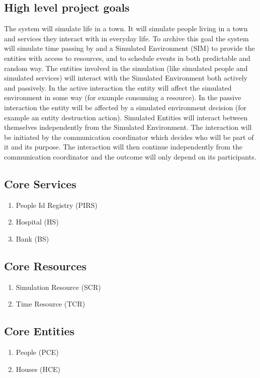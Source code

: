 \subsection{High level project goals} 
The system will simulate life in a town. It will simulate people living in a town and services they interact with in everyday life. 
To archive this goal the system will simulate time passing by and a Simulated Environment (SIM) to provide the entities with access to resources, 
and to schedule events in both predictable and random way.
The entities involved in the simulation (like simulated people and simulated services) will interact with the Simulated Environment both actively and passively. 
In the active interaction the entity will affect the simulated environment in some way (for example consuming a resource). 
In the passive interaction the entity will be affected by a simulated environment decision (for example an entity destruction action).
Simulated Entities will interact between themselves independently from the Simulated Environment. The interaction will be initiated by the communication coordinator
which decides who will be part of it and its purpose. The interaction will then continue independently from the communication coordinator and the outcome will only depend on 
its participants.

\subsection{Core Services} 
\begin{enumerate}
\item People Id Registry (PIRS)
\item Hospital (HS)
\item Bank (BS)
\end{enumerate}

\subsection{Core Resources} 
\begin{enumerate}
\item Simulation Resource (SCR)
\item Time Resource (TCR)
\end{enumerate}

\subsection{Core Entities} 
\begin{enumerate}
\item People (PCE)
\item Houses (HCE)
\end{enumerate}


